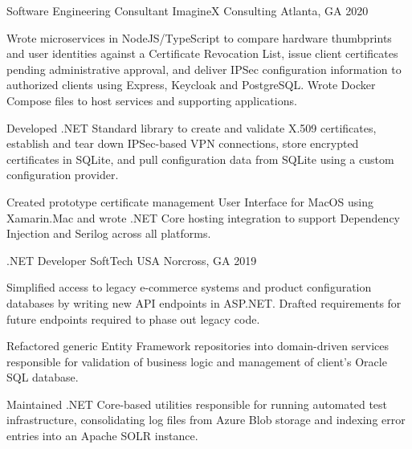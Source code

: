 \begin{cventries}
  \cventry
    {Software Engineering Consultant} %
    {ImagineX Consulting} %
    {Atlanta, GA} %
    {2020} %
    {
      \begin{cvitems} %
        \item {Wrote microservices in NodeJS/TypeScript to compare hardware thumbprints and user identities against a Certificate Revocation List, issue client certificates pending administrative approval, and deliver IPSec configuration information to authorized clients using Express, Keycloak and PostgreSQL. Wrote Docker Compose files to host services and supporting applications.}
        \item {Developed .NET Standard library to create and validate X.509 certificates, establish and tear down IPSec-based VPN connections, store encrypted certificates in SQLite, and pull configuration data from SQLite using a custom configuration provider.}
        \item {Created prototype certificate management User Interface for MacOS using Xamarin.Mac and wrote .NET Core hosting integration to support Dependency Injection and Serilog across all platforms.}
      \end{cvitems}
    }

  \cventry
    {.NET Developer} %
    {SoftTech USA} %
    {Norcross, GA} %
    {2019} %
    {
      \begin{cvitems} %
        \item {Simplified access to legacy e-commerce systems and product configuration databases by writing new API endpoints in ASP.NET. Drafted requirements for future endpoints required to phase out legacy code.}
        \item {Refactored generic Entity Framework repositories into domain-driven services responsible for validation of business logic and management of client's Oracle SQL database.}
        \item {Maintained .NET Core-based utilities responsible for running automated test infrastructure, consolidating log files from Azure Blob storage and indexing error entries into an Apache SOLR instance.}
      \end{cvitems}
    }


\end{cventries}
